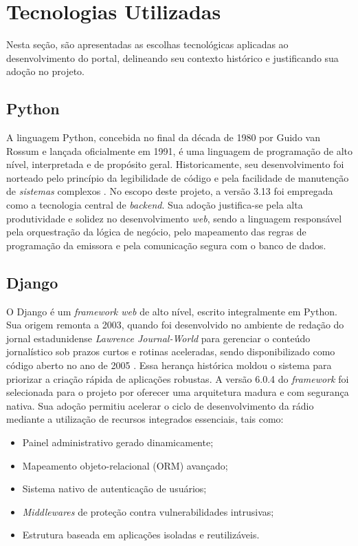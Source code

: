 \documentclass[12pt, openright, oneside, a4paper, brazil]{ads-unipac-abntex2}
\begin{document}
\section{Tecnologias Utilizadas}

Nesta seção, são apresentadas as escolhas tecnológicas aplicadas ao desenvolvimento do portal, delineando seu contexto histórico e justificando sua adoção no projeto.

\subsection{Python}

A linguagem Python, concebida no final da década de 1980 por Guido van Rossum e lançada oficialmente em 1991, é uma linguagem de programação de alto nível, interpretada e de propósito geral. Historicamente, seu desenvolvimento foi norteado pelo princípio da legibilidade de código e pela facilidade de manutenção de \textit{sistemas} complexos \cite{matthees}. No escopo deste projeto, a versão 3.13 foi empregada como a tecnologia central de \textit{backend}. Sua adoção justifica-se pela alta produtividade e solidez no desenvolvimento \textit{web}, sendo a linguagem responsável pela orquestração da lógica de negócio, pelo mapeamento das regras de programação da emissora e pela comunicação segura com o banco de dados.

\subsection{Django}

O Django é um \textit{framework web} de alto nível, escrito integralmente em Python. Sua origem remonta a 2003, quando foi desenvolvido no ambiente de redação do jornal estadunidense \textit{Lawrence Journal-World} para gerenciar o conteúdo jornalístico sob prazos curtos e rotinas aceleradas, sendo disponibilizado como código aberto no ano de 2005 \cite{django}. Essa herança histórica moldou o sistema para priorizar a criação rápida de aplicações robustas. A versão 6.0.4 do \textit{framework} foi selecionada para o projeto por oferecer uma arquitetura madura e com segurança nativa. Sua adoção permitiu acelerar o ciclo de desenvolvimento da rádio mediante a utilização de recursos integrados essenciais, tais como:

\begin{itemize}
    \item Painel administrativo gerado dinamicamente;
    \item Mapeamento objeto-relacional (ORM) avançado;
    \item Sistema nativo de autenticação de usuários;
    \item \textit{Middlewares} de proteção contra vulnerabilidades intrusivas;
    \item Estrutura baseada em aplicações isoladas e reutilizáveis.
\end{itemize}
\end{document}
